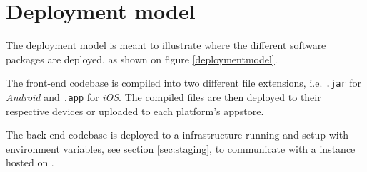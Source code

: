 \section{Deployment model}
The deployment model is meant to illustrate where the different software packages are deployed, as shown on figure \ref{deploymentmodel}.

The front-end codebase is compiled into two different file extensions, i.e. \verb+.jar+ for \textit{Android} and \verb+.app+ for \textit{iOS}. 
The compiled files are then deployed to their respective devices or uploaded to each platform's \gls{appstore}.

The back-end codebase is deployed to a  infrastructure running  and setup with environment variables, see section \ref{sec:staging}, to communicate with a  instance hosted on .

